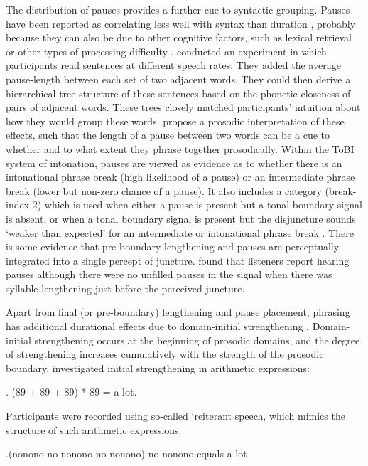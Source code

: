 \documentclass[preprint,review,12pt,authoryear,times]{elsarticle}
\begin{document}
The distribution of pauses provides a further cue to syntactic grouping. Pauses have been reported as correlating less well with syntax than duration \citep{gollr13}, probably because they can also be due to other cognitive factors, such as lexical retrieval or other types of processing difficulty \citep{goldm72}. \citet{grosj79} conducted an experiment in which participants read sentences at different speech rates. They added the average pause-length between each set of two adjacent words. They could then derive a hierarchical tree structure of these sentences based on the phonetic closeness of pairs of adjacent words. These trees  closely matched participants' intuition about how they would group these words.  \citet{gee83} propose a prosodic interpretation of these effects, such that the length of a pause between two words can be a cue to whether and to what extent they phrase together prosodically. Within the ToBI system of intonation, pauses are viewed as evidence as to whether there is an intonational phrase break (high likelihood of a pause) or an intermediate phrase break (lower but non-zero chance of a pause). It also includes a category (break-index 2) which is used when either a pause is present but a tonal boundary signal is absent, or when a tonal boundary signal is present but the disjuncture sounds `weaker than expected' for an intermediate or intonational phrase break \citep[35]{beckm97} . There is some evidence that pre-boundary lengthening and pauses are perceptually integrated into a single percept of juncture. \citet{Marti70, Marti71} found that listeners report hearing pauses although there were no unfilled pauses in the signal when there was syllable lengthening just before the perceived juncture. 

Apart from final (or pre-boundary) lengthening and pause placement, phrasing has additional durational effects due to domain-initial strengthening  \citep{fouge97, lavoi01, cho02, keati03,keati06,cho07,cho11,cho16}. Domain-initial strengthening occurs at the beginning of prosodic domains, and the degree of strengthening increases cumulatively with the strength of the prosodic boundary.  \citet{fouge97} investigated initial strengthening in arithmetic expressions:

\ex. (89 + 89 + 89) * 89 = a lot. \label{2arithm}

\noindent Participants were recorded using so-called `reiterant speech, which  mimics the structure of such arithmetic expressions:

\ex.(nonono no nonono no nonono) no nonono equals a lot
\end{document}

